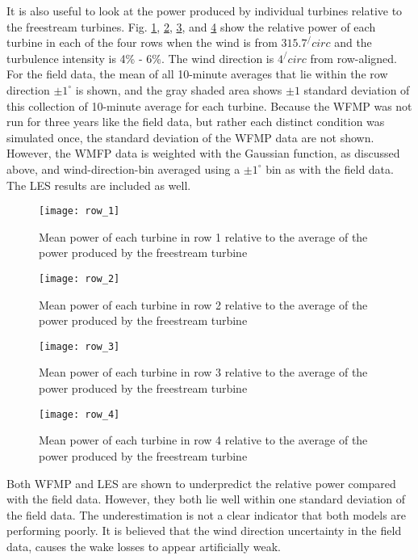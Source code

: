 \documentclass{umthesis}
\begin{document}
It is also useful to look at the power produced by individual turbines relative to the freestream turbines. Fig. \ref{fig:row_1}, \ref{fig:row_2}, \ref{fig:row_3}, and \ref{fig:row_4} show the relative power of each turbine in each of the four rows when the wind is from $315.7^/circ$ and the turbulence intensity is 4\% - 6\%. The wind direction is $4^/circ$ from row-aligned. For the field data, the mean of all 10-minute averages that lie within the row direction $\pm1^\circ$ is shown, and the gray shaded area shows $\pm1$ standard deviation of this collection of 10-minute average for each turbine. Because the WFMP was not run for three years like the field data, but rather each distinct condition was simulated once, the standard deviation of the WFMP data are not shown. However, the WMFP data is weighted with the Gaussian function, as discussed above, and wind-direction-bin averaged using a $\pm1^\circ$ bin as with the field data. The LES results are included as well.

\begin{figure}
  \centering
  \texttt{[image: row\_1]}
  \caption{Mean power of each turbine in row 1 relative to the average of the power produced by the freestream turbine}\label{fig:row_1}
\end{figure}

\begin{figure}
  \centering
  \texttt{[image: row\_2]}
  \caption{Mean power of each turbine in row 2 relative to the average of the power produced by the freestream turbine}\label{fig:row_2}
\end{figure}

\begin{figure}
  \centering
  \texttt{[image: row\_3]}
  \caption{Mean power of each turbine in row 3 relative to the average of the power produced by the freestream turbine}\label{fig:row_3}
\end{figure}

\begin{figure}
  \centering
  \texttt{[image: row\_4]}
  \caption{Mean power of each turbine in row 4 relative to the average of the power produced by the freestream turbine}\label{fig:row_4}
\end{figure}

Both WFMP and LES are shown to underpredict the relative power compared with the field data. However, they both lie well within one standard deviation of the field data. The underestimation is not a clear indicator that both models are performing poorly. It is believed that the wind direction uncertainty in the field data, causes the wake losses to appear artificially weak.  
\end{document}
